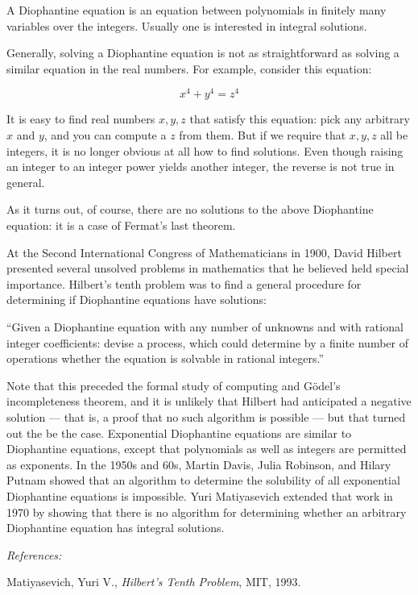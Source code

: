 \documentclass{article}
\begin{document}
A Diophantine equation is an equation between polynomials in finitely many variables over the integers. Usually one is interested in integral solutions.

Generally, solving a Diophantine equation is not as straightforward as solving a similar equation in the real numbers.  For example, consider this equation:

$$x^4+ y^4 = z^4$$

It is easy to find real numbers $x, y, z$ that satisfy this equation: pick any arbitrary $x$ and $y$, and you can compute a $z$ from them.  But if we require that $x, y, z$ all be integers, it is no longer obvious at all how to find solutions.  Even though raising an integer to an integer power yields another integer, the reverse is not true in general.

As it turns out, of course, there are no solutions to the above Diophantine equation: it is a case of Fermat's last theorem.

At the Second International Congress of Mathematicians in 1900, David Hilbert presented several unsolved problems in mathematics that he believed held special importance.  Hilbert's tenth problem was to find a general procedure for determining if Diophantine equations have solutions:

``Given a Diophantine equation with any number of unknowns and with rational integer coefficients: devise a process, which could determine by a finite number of operations whether the equation is solvable in rational integers.''

Note that this preceded the formal study of computing and G\"odel's incompleteness theorem, and it is unlikely that Hilbert had anticipated a negative solution --- that is, a proof that no such algorithm is possible --- but that turned out the be the case. Exponential Diophantine equations are similar to Diophantine equations, except that polynomials as well as integers are permitted as exponents. In the 1950s and 60s, Martin Davis, Julia Robinson, and Hilary Putnam showed that an algorithm to determine the solubility of all exponential Diophantine equations is impossible. Yuri Matiyasevich extended that work in 1970 by showing that there is no algorithm for determining whether an arbitrary Diophantine equation has integral solutions.

{\em References:}

Matiyasevich, Yuri V., {\em Hilbert's Tenth Problem}, MIT, 1993.
\end{document}
